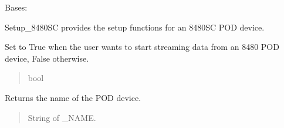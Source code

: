 \documentclass[letterpaper,10pt,english]{sphinxmanual}
\begin{document}
\begin{fulllineitems}
\label{\detokenize{Setup.SetupOneDevice:Setup.SetupOneDevice.Setup_8480SC.Setup8480SC}}
\pysigstartsignatures
{}
\pysigstopsignatures
\sphinxAtStartPar
Bases: {\hyperref[\detokenize{Setup.SetupOneDevice:Setup.SetupOneDevice.Setup_PodInterface.SetupInterface}]{}}

\sphinxAtStartPar
Setup\_8480SC provides the setup functions for an 8480\sphinxhyphen{}SC POD device.

\begin{fulllineitems}
\label{\detokenize{Setup.SetupOneDevice:Setup.SetupOneDevice.Setup_8480SC.Setup8480SC._streamMode}}
\pysigstartsignatures
{}
\pysigstopsignatures
\sphinxAtStartPar
Set to True when the user wants to start streaming data from             an 8480 POD device, False otherwise.
\begin{quote}\begin{description}
\sphinxAtStartPar
bool

\end{description}\end{quote}

\end{fulllineitems}


\begin{fulllineitems}
\label{\detokenize{Setup.SetupOneDevice:Setup.SetupOneDevice.Setup_8480SC.Setup8480SC.GetDeviceName}}
\pysigstartsignatures
{}
\pysigstopsignatures
\sphinxAtStartPar
Returns the name of the POD device.
\begin{quote}\begin{description}
\sphinxAtStartPar
String of \_NAME.


\end{description}
\end{quote}
\end{fulllineitems}
\end{fulllineitems}
\end{document}
